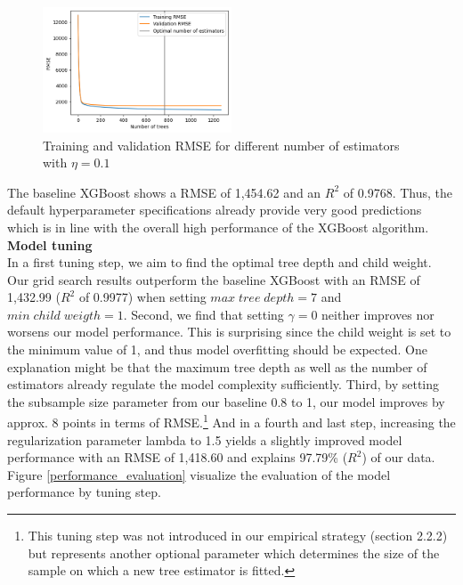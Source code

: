 \documentclass[12pt]{article}
\begin{document}
\begin{figure}[ht]
    \centering
    \includegraphics[width=0.5\textwidth]{xgb_num_estimators.png}
    \caption{Training and validation RMSE for different number of estimators with $\eta = 0.1$}
    \label{xgb_num_estimators}
\end{figure}
\FloatBarrier

\noindent The baseline XGBoost shows a RMSE of 1,454.62 and an $R^{2}$ of 0.9768. Thus, the default hyperparameter specifications already provide very good predictions which is in line with the overall high performance of the XGBoost algorithm.\\

\noindent \textbf{Model tuning} \\
\noindent In a first tuning step, we aim to find the optimal tree depth and child weight. Our grid search results outperform the baseline XGBoost with an RMSE of 1,432.99 ($R^{2}$ of 0.9977) when setting $max \; tree \; depth = 7$ and $min\; child \; weigth = 1$. Second, we find that setting $\gamma = 0$ neither improves nor worsens our model performance. This is surprising since the child weight is set to the minimum value of 1, and thus model overfitting should be expected. One explanation might be that the maximum tree depth as well as the number of estimators already regulate the model complexity sufficiently. Third, by setting the subsample size parameter from our baseline 0.8 to 1, our model improves by approx. 8 points in terms of RMSE.\footnote{This tuning step was not introduced in our empirical strategy (section 2.2.2) but represents another optional parameter which determines the size of the sample on which a new tree estimator is fitted.} And in a fourth and last step, increasing the regularization parameter lambda to 1.5 yields a slightly improved model performance with an RMSE of 1,418.60 and explains 97.79\% ($R^{2}$) of our data. Figure \ref{performance_evaluation} visualize the evaluation of the model performance by tuning step.
\end{document}
